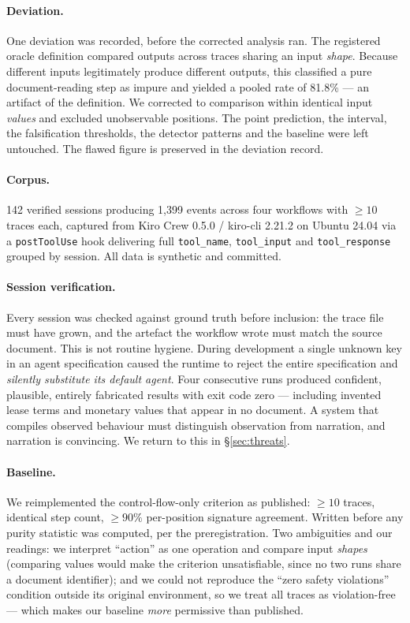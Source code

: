 \documentclass[10pt,conference]{article}
\begin{document}
\paragraph{Deviation.} One deviation was recorded, before the corrected analysis
ran. The registered oracle definition compared outputs across traces sharing an
input \emph{shape}. Because different inputs legitimately produce different
outputs, this classified a pure document-reading step as impure and yielded a
pooled rate of 81.8\% --- an artifact of the definition. We corrected to
comparison within identical input \emph{values} and excluded unobservable
positions. The point prediction, the interval, the falsification thresholds, the
detector patterns and the baseline were left untouched. The flawed figure is
preserved in the deviation record.

\paragraph{Corpus.} 142 verified sessions producing 1{,}399 events across four
workflows with $\geq 10$ traces each, captured from Kiro Crew 0.5.0 / kiro-cli
2.21.2 on Ubuntu 24.04 via a \texttt{postToolUse} hook delivering full
\texttt{tool\_name}, \texttt{tool\_input} and \texttt{tool\_response} grouped by
session. All data is synthetic and committed.

\paragraph{Session verification.} Every session was checked against ground truth
before inclusion: the trace file must have grown, and the artefact the workflow
wrote must match the source document. This is not routine hygiene. During
development a single unknown key in an agent specification caused the runtime to
reject the entire specification and \emph{silently substitute its default
agent}. Four consecutive runs produced confident, plausible, entirely fabricated
results with exit code zero --- including invented lease terms and monetary
values that appear in no document. A system that compiles observed behaviour
must distinguish observation from narration, and narration is convincing. We
return to this in \S\ref{sec:threats}.

\paragraph{Baseline.} We reimplemented the control-flow-only criterion as
published: $\geq 10$ traces, identical step count, $\geq 90\%$ per-position
signature agreement. Written before any purity statistic was computed, per the
preregistration. Two ambiguities and our readings: we interpret ``action'' as
one operation and compare input \emph{shapes} (comparing values would make the
criterion unsatisfiable, since no two runs share a document identifier); and we
could not reproduce the ``zero safety violations'' condition outside its
original environment, so we treat all traces as violation-free --- which makes
our baseline \emph{more} permissive than published.
\end{document}
